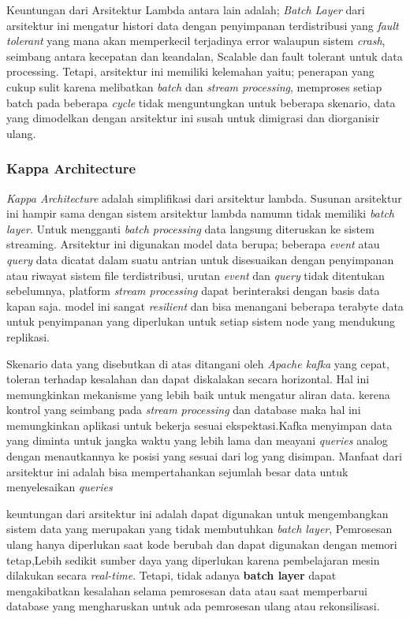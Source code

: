 Keuntungan dari Arsitektur Lambda antara lain adalah; \textit{Batch Layer} dari arsitektur ini mengatur histori data dengan penyimpanan terdistribusi yang \textit{fault tolerant} yang mana akan memperkecil terjadinya error walaupun sistem \textit{crash}, seimbang antara kecepatan dan keandalan, Scalable dan fault tolerant untuk data processing. Tetapi, arsitektur ini memiliki kelemahan yaitu; penerapan yang cukup sulit karena melibatkan \textit{batch} dan \textit{stream processing}, memproses setiap batch pada beberapa \textit{cycle} tidak menguntungkan untuk beberapa skenario, data yang dimodelkan dengan arsitektur ini susah untuk dimigrasi dan diorganisir ulang.

\subsubsection{Kappa Architecture}
\textit{Kappa Architecture} adalah simplifikasi dari arsitektur lambda. Susunan arsitektur ini hampir sama dengan sistem arsitektur lambda namumn tidak memiliki \textit{batch layer}. 
Untuk mengganti \textit{batch processing} data langsung diteruskan ke sistem streaming. 
Arsitektur ini digunakan model data berupa; beberapa \textit{event} atau \textit{query} data dicatat 
dalam suatu antrian untuk disesuaikan dengan penyimpanan atau riwayat sistem file terdistribusi, 
urutan \textit{event} dan \textit{query} tidak ditentukan sebelumnya, platform \textit{stream 
processing} dapat berinteraksi dengan basis data kapan saja. model ini sangat \textit{resilient} dan 
bisa menangani beberapa terabyte data untuk penyimpanan yang diperlukan untuk setiap sistem node 
yang mendukung replikasi.


Skenario data yang disebutkan di atas ditangani oleh \textit{Apache kafka} yang cepat, toleran 
terhadap kesalahan dan dapat diskalakan secara horizontal. Hal ini memungkinkan mekanisme yang lebih 
baik untuk mengatur aliran data. kerena kontrol yang seimbang pada \textit{stream processing} dan 
database maka hal ini memungkinkan aplikasi untuk bekerja sesuai ekspektasi.Kafka menyimpan data 
yang diminta untuk jangka waktu yang lebih lama dan meayani \textit{queries} analog dengan 
menautkannya ke posisi yang sesuai dari log yang disimpan. Manfaat dari arsitektur ini adalah bisa 
mempertahankan sejumlah besar data untuk menyelesaikan \textit{queries}

keuntungan dari arsitektur ini adalah dapat digunakan untuk mengembangkan sistem data yang merupakan 
yang tidak membutuhkan \textit{batch layer}, Pemrosesan ulang hanya diperlukan saat kode berubah dan 
dapat digunakan dengan memori tetap,Lebih sedikit sumber daya yang diperlukan karena pembelajaran 
mesin dilakukan secara \textit{real-time}. Tetapi, tidak adanya \textbf{batch layer} dapat 
mengakibatkan kesalahan selama pemrosesan data atau saat memperbarui database yang mengharuskan 
untuk ada pemrosesan ulang atau rekonsilisasi.

